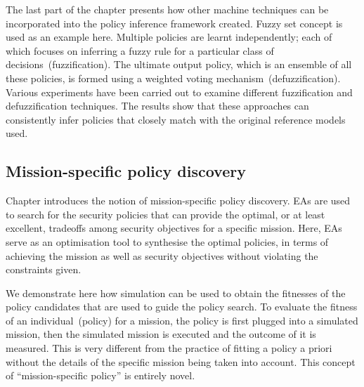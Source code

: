 The last part of the chapter presents how other machine techniques can
be incorporated into the policy inference framework created. Fuzzy set
concept is used as an example here. Multiple policies are learnt
independently; each of which focuses on inferring a fuzzy rule for a
particular class of decisions~(fuzzification). The ultimate output
policy, which is an ensemble of all these policies, is formed using a
weighted voting mechanism~(defuzzification). Various experiments have
been carried out to examine different fuzzification and
defuzzification techniques. The results show that these approaches can
consistently infer policies that closely match with the original
reference models used.

\subsection{Mission-specific policy discovery}
\label{Evaluation.MissionSpecificPolicyDiscovery}
Chapter introduces the notion of
mission-specific policy discovery. EAs are used to search for the
security policies that can provide the optimal, or at least excellent,
tradeoffs among security objectives for a specific mission. Here, EAs
serve as an optimisation tool to synthesise the optimal policies, in
terms of achieving the mission as well as security objectives without
violating the constraints given.

We demonstrate here how simulation can be used to obtain the fitnesses
of the policy candidates that are used to guide the policy search. To
evaluate the fitness of an individual~(policy) for a mission, the
policy is first plugged into a simulated mission, then the simulated
mission is executed and the outcome of it is measured. This is very
different from the practice of fitting a policy a priori without the
details of the specific mission being taken into account. This concept
of ``mission-specific policy'' is entirely novel.

